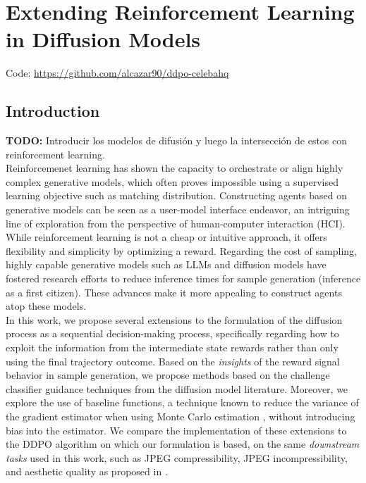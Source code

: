 \chapter{Extending Reinforcement Learning in Diffusion Models}

Code: \href{https://github.com/alcazar90/ddpo-celebahq}{https://github.com/alcazar90/ddpo-celebahq}

\section{Introduction}

\textbf{TODO:} Introducir los modelos de difusión y luego la intersección de
estos con reinforcement learning. \\

Reinforcemenet learning has shown the capacity to orchestrate or align highly complex generative models, which often proves impossible using a supervised learning objective such as matching distribution. Constructing agents based on generative models can be seen as a user-model interface endeavor, an intriguing line of exploration from the perspective of human-computer interaction (HCI). While reinforcement learning is not a cheap or intuitive approach, it offers flexibility and simplicity by optimizing a reward. Regarding the cost of sampling, highly capable generative models such as LLMs and diffusion models have fostered research efforts to reduce inference times for sample generation (inference as a first citizen). These advances make it more appealing to construct agents atop these models. \\

In this work, we propose several extensions to the formulation of the diffusion process as a sequential decision-making process, specifically regarding how to exploit the information from the intermediate state rewards rather than only using the final trajectory outcome. Based on the \textit{insights} of the reward signal behavior in sample generation, we propose methods based on the challenge classifier guidance techniques from the diffusion model literature. Moreover, we explore the use of baseline functions, a technique known to reduce the variance of the gradient estimator when using Monte Carlo estimation \cite{mohamed2020monte}, without introducing bias into the estimator. We compare the implementation of these extensions to the DDPO algorithm \cite{black2023training} on which our formulation is based, on the same \textit{downstream tasks} used in this work, such as JPEG compressibility, JPEG incompressibility, and aesthetic quality as proposed in \cite{black2023training}. \\


